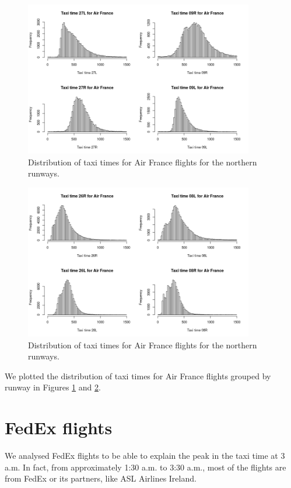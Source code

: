 \documentclass{article}
\begin{document}
\begin{figure}[h!!!!!!!!]
	\centering
	\includegraphics[width=10cm]{AFR_pistes_nord}
	\caption{Distribution of taxi times for Air France flights for the northern runways.}
	\label{distN}
\end{figure}
\begin{center}
\begin{figure}[h!!!!!!!!]
	\centering
	\includegraphics[width=10cm]{AFR_pistes_sud}
	\caption{Distribution of taxi times for Air France flights for the northern runways.}
	\label{distS}
\end{figure}
\end{center}


\newpage

We plotted the distribution of taxi times for Air France flights grouped by runway in Figures \ref{distN} and \ref{distS}.

\section{FedEx flights}
We analysed FedEx flights to be able to explain the peak in the taxi time at 3 a.m. In fact, from approximately 1:30 a.m. to 3:30 a.m., most of the flights are from FedEx or its partners, like ASL Airlines Ireland.
\end{document}
